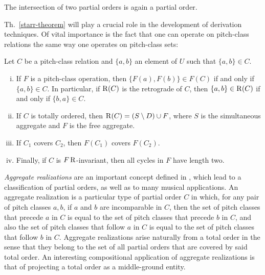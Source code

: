 \begin{theorem}
    \cite[194]{Starr1984}
    The intersection of two partial orders is again a partial order.
\end{theorem}

Th.~\ref{starr-theorem} will play a crucial role in the development of derivation techniques. Of vital importance is the fact that one can operate on pitch-class relations the same way one operates on pitch-class sets:

\begin{theorem}
    \cite[195]{Starr1984}
    Let $C$ be a pitch-class relation and $\{ a, b \}$ an element of $U$ such that $\{ a, b \} \in C$.
    \begin{enumerate}[i.]
        \item If $F$ is a pitch-class operation, then $\{ F(a), F(b) \} \in F(C)$ if and only if $\{ a, b \} \in C$. In particular, if $\operatorname{R}(C)$ is the retrograde of $C$, then $\{ a, b \} \in \operatorname{R}(C)$ if and only if $\{ b, a \} \in C$.
        \item If $C$ is totally ordered, then $\operatorname{R}(C) = (S \setminus D) \cup F$, where $S$ is the simultaneous aggregate and $F$ is the free aggregate.
        \item If $C_1$ covers $C_2$, then $F(C_1)$ covers $F(C_2)$.
        \item Finally, if $C$ is $F\operatorname{R}$-invariant, then all cycles in $F$ have length two.
    \end{enumerate}
\end{theorem}

\emph{Aggregate realizations} are an important concept defined in \cite[197]{Starr1984}, which lead to a classification of partial orders, as well as to many musical applications. An aggregate realization is a particular type of partial order $C$ in which, for any pair of pitch classes $a, b$, if $a$ and $b$ are incomparable in $C$, then the set of pitch classes that precede $a$ in $C$ is equal to the set of pitch classes that precede $b$ in $C$, and also the set of pitch classes that follow $a$ in $C$ is equal to the set of pitch classes that follow $b$ in $C$. Aggregate realizations arise naturally from a total order in the sense that they belong to the set of all partial orders that are covered by said total order. An interesting compositional application of aggregate realizations is that of projecting a total order as a middle-ground entity.

